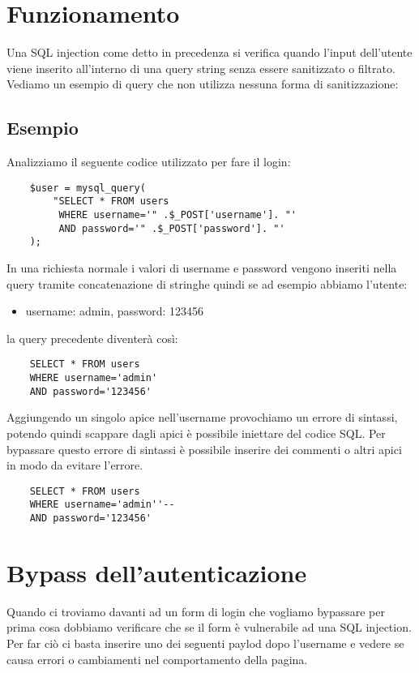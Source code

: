 \documentclass[oneside,a4paper,11pt]{book}
\theoremstyle{italicstyle}
\theoremstyle{normStyle}
\begin{document}
\section{Funzionamento}
Una SQL injection come detto in precedenza si verifica quando l'input dell'utente viene inserito all'interno di una query string senza essere sanitizzato o filtrato. Vediamo un esempio di query che non utilizza nessuna forma di sanitizzazione:

\subsection{Esempio}
Analizziamo il seguente codice utilizzato per fare il login:
\begin{lstlisting}
    $user = mysql_query(
        "SELECT * FROM users
         WHERE username='" .$_POST['username']. "'
         AND password='" .$_POST['password']. "'
    );
\end{lstlisting}
In una richiesta normale i valori di username e password vengono inseriti nella query tramite concatenazione di stringhe quindi se ad esempio abbiamo l'utente:
\begin{itemize}
    \item username: admin, password: 123456
\end{itemize}
la query precedente diventerà così:
\begin{lstlisting}
    SELECT * FROM users
    WHERE username='admin'
    AND password='123456'
\end{lstlisting}

Aggiungendo un singolo apice nell'username provochiamo un errore di sintassi, potendo quindi scappare dagli apici è possibile iniettare del codice SQL. Per bypassare questo errore di sintassi è possibile inserire dei commenti o altri apici in modo da evitare l'errore.

\begin{lstlisting}
    SELECT * FROM users
    WHERE username='admin''--
    AND password='123456'
\end{lstlisting}

\section{Bypass dell'autenticazione}
Quando ci troviamo davanti ad un form di login che vogliamo bypassare per prima cosa dobbiamo verificare che se il form è vulnerabile ad una SQL injection. Per far ciò ci basta inserire uno dei seguenti paylod dopo l'username e vedere se causa errori o cambiamenti nel comportamento della pagina.
\end{document}
